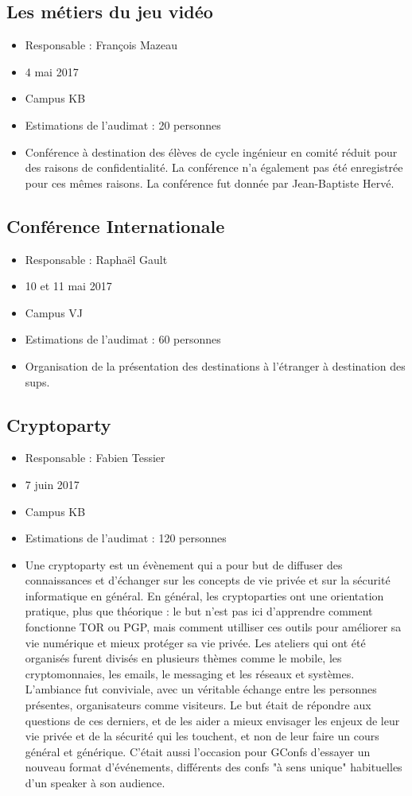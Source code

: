 \documentclass[12pt,a4paper]{article}
\begin{document}
\subsection{Les métiers du jeu vidéo}
\begin{itemize}
\item Responsable : François Mazeau
\item 4 mai 2017
\item Campus KB
\item Estimations de l'audimat : 20 personnes
\item Conférence à destination des élèves de cycle ingénieur en comité réduit pour des raisons de confidentialité. La conférence n'a également pas été enregistrée pour ces mêmes raisons. La conférence fut donnée par Jean-Baptiste Hervé.
\end{itemize}

\subsection{Conférence Internationale}
\begin{itemize}
\item Responsable : Raphaël Gault
\item 10 et 11 mai 2017
\item Campus VJ
\item Estimations de l'audimat : 60 personnes
\item Organisation de la présentation des destinations à l'étranger à destination des sups.
\end{itemize}

\subsection{Cryptoparty}
\begin{itemize}
\item Responsable : Fabien Tessier
\item 7 juin 2017
\item Campus KB
\item Estimations de l'audimat : 120 personnes
\item Une cryptoparty est un évènement qui a pour but de diffuser des 
connaissances et d'échanger sur les concepts de vie privée et sur
la sécurité informatique en général.
En général, les cryptoparties ont une orientation pratique, plus que théorique :
le but n'est pas ici d'apprendre comment fonctionne TOR ou PGP, mais
comment utilliser ces outils pour améliorer sa vie numérique et mieux protéger sa vie privée.
Les ateliers qui ont été organisés furent divisés en plusieurs thèmes comme le mobile, les cryptomonnaies, les emails, le messaging et les réseaux et systèmes.
L'ambiance fut conviviale, avec un véritable échange entre les personnes
présentes, organisateurs comme visiteurs. Le but était de répondre aux questions
de ces derniers, et de les aider a mieux envisager les enjeux de leur vie privée et
de la sécurité qui les touchent, et non de leur faire un cours général et générique. C'était aussi l'occasion pour GConfs d'essayer un nouveau format d'événements, différents des confs "à sens unique" habituelles d'un speaker à son audience.
\end{itemize}
\end{document}
